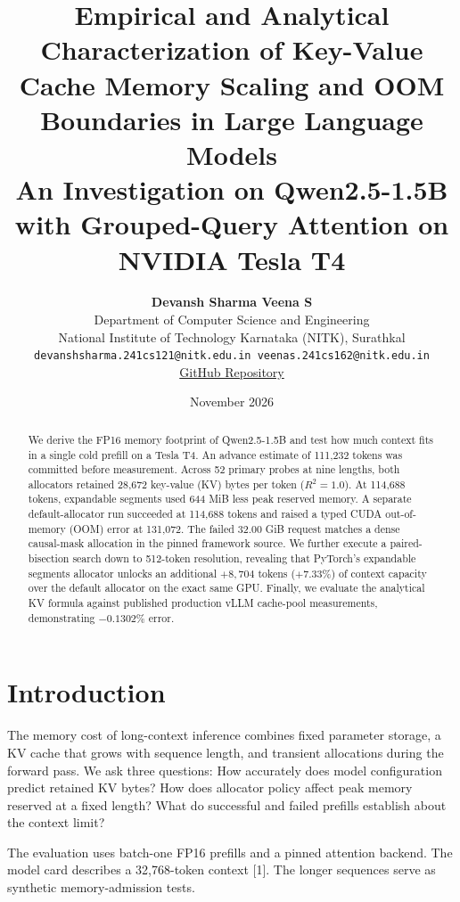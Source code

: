 \documentclass[11pt,a4paper]{article}
\title{
    \vspace{-1.2cm}
    \textbf{\Large Empirical and Analytical Characterization of Key-Value Cache Memory Scaling and OOM Boundaries in Large Language Models}\\[0.3cm]
    \large An Investigation on Qwen2.5-1.5B with Grouped-Query Attention on NVIDIA Tesla T4
}
\author{
    \textbf{Devansh Sharma \qquad Veena S}\\[0.15cm]
    Department of Computer Science and Engineering\\
    National Institute of Technology Karnataka (NITK), Surathkal\\
    \texttt{devanshsharma.241cs121@nitk.edu.in \qquad veenas.241cs162@nitk.edu.in}\\[0.15cm]
    \href{https://github.com/DevanshSharma351/KV-Cache-Scaling}{GitHub Repository}
}
\date{November 2026}
\begin{document}
\maketitle

\begin{abstract}
We derive the FP16 memory footprint of Qwen2.5-1.5B and test how much context fits in a single cold prefill on a Tesla T4. An advance estimate of 111,232 tokens was committed before measurement. Across 52 primary probes at nine lengths, both allocators retained 28,672 key-value (KV) bytes per token ($R^2 = 1.0$). At 114,688 tokens, expandable segments used 644 MiB less peak reserved memory. A separate default-allocator run succeeded at 114,688 tokens and raised a typed CUDA out-of-memory (OOM) error at 131,072. The failed 32.00 GiB request matches a dense causal-mask allocation in the pinned framework source. We further execute a paired-bisection search down to 512-token resolution, revealing that PyTorch's expandable segments allocator unlocks an additional $+8{,}704$ tokens ($+7.33\%$) of context capacity over the default allocator on the exact same GPU. Finally, we evaluate the analytical KV formula against published production vLLM cache-pool measurements, demonstrating $-0.1302\%$ error.
\end{abstract}

\section{Introduction}
The memory cost of long-context inference combines fixed parameter storage, a KV cache that grows with sequence length, and transient allocations during the forward pass. We ask three questions: How accurately does model configuration predict retained KV bytes? How does allocator policy affect peak memory reserved at a fixed length? What do successful and failed prefills establish about the context limit?

The evaluation uses batch-one FP16 prefills and a pinned attention backend. The model card describes a 32,768-token context [1]. The longer sequences serve as synthetic memory-admission tests.
\end{document}
